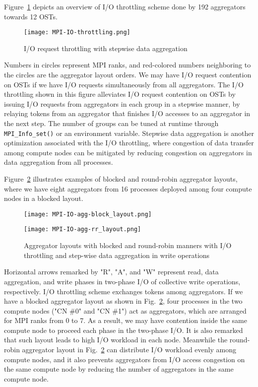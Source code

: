 \documentclass{jhps}
\begin{document}
Figure~\ref{fig:IO_THROT} depicts an overview of I/O throttling
scheme done by 192 aggregators towards 12 OSTs.
%
\begin{figure}[htb]
\centering
\texttt{[image: MPI-IO-throttling.png]}
\caption{I/O request throttling with stepwise data aggregation}
\label{fig:IO_THROT}
\end{figure}
%
Numbers in circles represent MPI ranks, and red-colored numbers neighboring
to the circles are the aggregator layout orders.
We may have I/O request contention on OSTs
if we have I/O requests simultaneously from all aggregators.
The I/O throttling shown in this figure alleviates I/O request contention
on OSTs by issuing I/O requests from aggregators in each group in a stepwise manner,
by relaying tokens from an aggregator that finishes
I/O accesses to an aggregator in the next step.
The number of groups can be tuned at runtime through {\tt MPI\_Info\_set()}
or an environment variable.
Stepwise data aggregation is another optimization associated
with the I/O throttling, where congestion of data transfer
among compute nodes can be mitigated by reducing congestion
on aggregators in data aggregation from all processes.

Figure~\ref{fig:AGG_RR_LAYOUT} illustrates examples of blocked and round-robin
aggregator layouts, where we have eight aggregators from 16 processes
deployed among four compute nodes in a blocked layout.
%
\begin{figure}[htb]
\centering
\begin{minipage}[t]{0.36\textwidth}
\centering
\texttt{[image: MPI-IO-agg-block\_layout.png]}
\label{fig:BLK_LAYOUT}
\end{minipage}
\noindent
\begin{minipage}[t]{0.36\textwidth}
\centering
\texttt{[image: MPI-IO-agg-rr\_layout.png]}
\label{fig:RR_LAYOUT}
\end{minipage}
\caption{Aggregator layouts with blocked and round-robin manners with
I/O throttling and step-wise data aggregation in write operations}
\label{fig:AGG_RR_LAYOUT}
\end{figure}
%
Horizontal arrows remarked by "R", "A", and "W" represent
read, data aggregation, and write phases in two-phase I/O of collective write
operations, respectively.
I/O throttling scheme exchanges tokens among aggregators.
If we have a blocked aggregator layout as shown in
Fig.~\ref{fig:AGG_RR_LAYOUT},
four processes in the two compute nodes ("CN \#0" and "CN \#1")
act as aggregators, which are arranged for MPI ranks from 0 to 7.
As a result, we may have contention inside the same compute node
to proceed each phase in the two-phase I/O.
It is also remarked that such layout leads to high I/O workload
in each node.
Meanwhile the round-robin aggregator layout in
Fig.~\ref{fig:AGG_RR_LAYOUT}
can distribute I/O workload evenly
among compute nodes, and it also prevents aggregators
from I/O access congestion on the same compute node
by reducing the number of aggregators in the same compute node.
\end{document}
